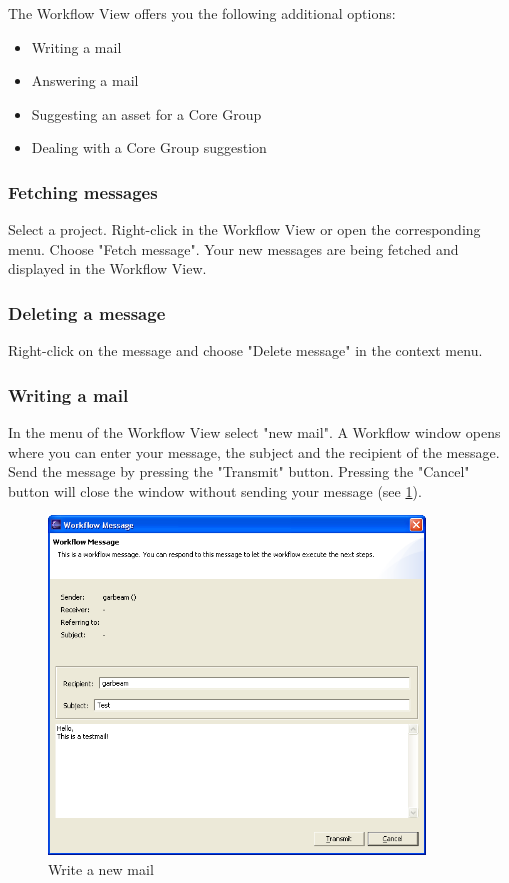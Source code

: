 The Workflow View offers you the following additional options:
\begin{itemize}
	\item Writing a mail
	\item Answering a mail
	\item Suggesting an asset for a Core Group
	\item Dealing with a Core Group suggestion
\end{itemize}


\subsubsection {Fetching messages}

Select a project. Right-click in the Workflow View or open the corresponding menu. Choose "Fetch message".
Your new messages are being fetched and displayed in the Workflow View.


\subsubsection{Deleting a message}

Right-click on the message and choose "Delete message" in the context menu.


\subsubsection{Writing a mail}

In the menu of the Workflow View select "new mail". A Workflow window opens where
you can enter your message, the subject and the recipient of the message. Send the
message by pressing the "Transmit" button. Pressing the "Cancel" button will close the window
without sending your message (see \ref{writemail}).

\begin{figure}[h!]
\begin{center}
\includegraphics[width=10cm]{writemail.png}
   \caption{Write a new mail}
\label{writemail}
\end{center}
\end{figure}\par

